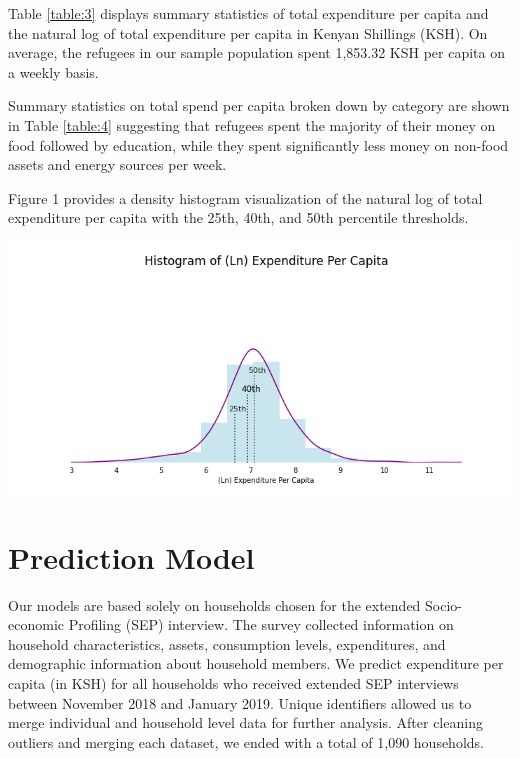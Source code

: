 \documentclass{article}
\begin{document}
Table \ref{table:3} displays summary statistics of total expenditure per capita and the natural log of total expenditure per capita in Kenyan Shillings (KSH). On average, the refugees in our sample population spent 1,853.32 KSH per capita on a weekly basis. 



Summary statistics on total spend per capita broken down by category are shown in Table \ref{table:4} suggesting that refugees spent the majority of their money on food followed by education, while they spent significantly less money on non-food assets and energy sources per week. 


Figure 1 provides a density histogram visualization of the natural log of total expenditure per capita with the 25th, 40th, and 50th percentile thresholds. 





\includegraphics[scale=0.4]{images/figure1.png}




\section{Prediction Model}

Our models are based solely on households chosen for the extended Socio-economic Profiling (SEP) interview. The survey collected information on household characteristics, assets, consumption levels, expenditures, and demographic information about household members. We predict expenditure per capita (in KSH) for all households who received extended SEP interviews between November 2018 and January 2019. Unique identifiers allowed us to merge individual and household level data for further analysis. After cleaning outliers and merging each dataset, we ended with a total of 1,090 households. 
\end{document}
